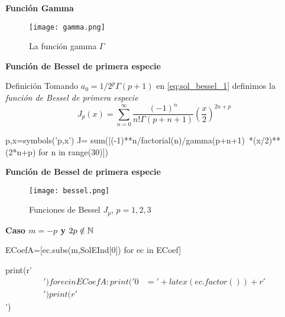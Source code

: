 \begin{frame}[fragile]{\textbf{Función Gamma}}

\begin{figure}[h]
\begin{center}
\texttt{[image: gamma.png]}
\caption{La función gamma $\Gamma$}
\end{center}
\end{figure}


\end{frame}



\begin{frame}[fragile]{\textbf{Función de Bessel de primera especie}}



\begin{block}{Definición} Tomando  $a_0=1/2^p\Gamma(p+1)$ en 
\eqref{eq:sol_bessel_1} definimos la \emph{función de Bessel de primera especie} 
\[J_p(x)=\sum_{n=0}^{\infty}\frac{(-1)^n}{n!\Gamma(p+n+1)}\left(\frac{x}{2}\right)^{2n+p}\]
\end{block}


\begin{sympyblock}[][numbers=left,frame=single,framesep=5mm]
p,x=symbols('p,x')
J= sum([(-1)**n/factorial(n)/gamma(p+n+1)\
    *(x/2)**(2*n+p) for n in range(30)])
\end{sympyblock}
\end{frame}



\begin{frame}[fragile]{\textbf{Función de Bessel de primera especie}}

\begin{figure}[h]
\begin{center}
\texttt{[image: bessel.png]}
\end{center}

\caption{Funciones de Bessel $J_p$, $p=1,2,3$}\label{fig:bessel}

\end{figure}

\end{frame}





\begin{frame}[fragile]{\textbf{Caso $m=-p$ y $2p\notin\mathbb{N}$}}




\begin{sympyblock}[][numbers=left,frame=single,framesep=5mm]
ECoefA=[ec.subs(m,SolEInd[0]) for ec in ECoef]
\end{sympyblock}

\begin{sympycode}[][numbers=left,frame=single,framesep=5mm]
print(r'\begin{align*}') 
for ec in ECoefA:
    print('0&='+latex(ec.factor())+r'\\') 
print(r'\end{align*}')
\end{sympycode}


\end{frame}



